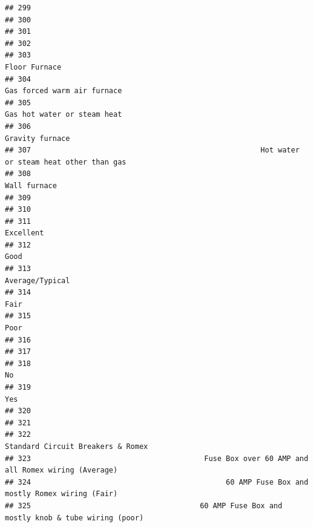 \documentclass[
]{article}
\begin{document}
\begin{verbatim}
## 299                                                                                           
## 300                                                                                           
## 301                                                                                           
## 302                                                                                           
## 303                                                                              Floor Furnace
## 304                                                                Gas forced warm air furnace
## 305                                                                Gas hot water or steam heat
## 306                                                                            Gravity furnace
## 307                                                     Hot water or steam heat other than gas
## 308                                                                               Wall furnace
## 309                                                                                           
## 310                                                                                           
## 311                                                                                  Excellent
## 312                                                                                       Good
## 313                                                                            Average/Typical
## 314                                                                                       Fair
## 315                                                                                       Poor
## 316                                                                                           
## 317                                                                                           
## 318                                                                                         No
## 319                                                                                        Yes
## 320                                                                                           
## 321                                                                                           
## 322                                                          Standard Circuit Breakers & Romex
## 323                                        Fuse Box over 60 AMP and all Romex wiring (Average)
## 324                                             60 AMP Fuse Box and mostly Romex wiring (Fair)
## 325                                       60 AMP Fuse Box and mostly knob & tube wiring (poor)

\end{verbatim}
\end{document}
